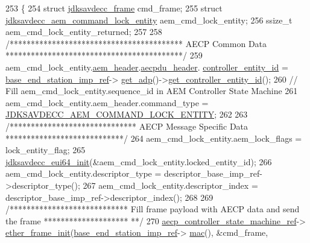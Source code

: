 \begin{DoxyCode}
253 \{
254     \textcolor{keyword}{struct }\hyperlink{structjdksavdecc__frame}{jdksavdecc\_frame} cmd\_frame;
255     \textcolor{keyword}{struct }\hyperlink{structjdksavdecc__aem__command__lock__entity}{jdksavdecc\_aem\_command\_lock\_entity} aem\_cmd\_lock\_entity;
256     ssize\_t aem\_cmd\_lock\_entity\_returned;
257 
258     \textcolor{comment}{/***************************************** AECP Common Data ******************************************/}
259     aem\_cmd\_lock\_entity.\hyperlink{structjdksavdecc__aem__command__lock__entity_ae1e77ccb75ff5021ad923221eab38294}{aem\_header}.\hyperlink{structjdksavdecc__aecpdu__aem_ae8460ae179666e7ce268ed1ef33d0de3}{aecpdu\_header}.
      \hyperlink{structjdksavdecc__aecpdu__common_affc928ddb4fc62d1d04a775d36e5f2c8}{controller\_entity\_id} = \hyperlink{classavdecc__lib_1_1descriptor__base__imp_a550c969411f5f3b69f55cc139763d224}{base\_end\_station\_imp\_ref}->
      \hyperlink{classavdecc__lib_1_1end__station__imp_a471a74540ce6182fad0c17dfd010107e}{get\_adp}()->\hyperlink{classavdecc__lib_1_1adp_a0c0959a46658c0a22e9530334b2912da}{get\_controller\_entity\_id}();
260     \textcolor{comment}{// Fill aem\_cmd\_lock\_entity.sequence\_id in AEM Controller State Machine}
261     aem\_cmd\_lock\_entity.aem\_header.command\_type = 
      \hyperlink{group__command_ga96be22db90d10cec463db06ab42751c4}{JDKSAVDECC\_AEM\_COMMAND\_LOCK\_ENTITY};
262 
263     \textcolor{comment}{/****************************** AECP Message Specific Data ****************************/}
264     aem\_cmd\_lock\_entity.aem\_lock\_flags = lock\_entity\_flag;
265     \hyperlink{group__eui64_ga6eda4ed21b6f0d526b180ac633eeba69}{jdksavdecc\_eui64\_init}(&aem\_cmd\_lock\_entity.locked\_entity\_id);
266     aem\_cmd\_lock\_entity.descriptor\_type = descriptor\_base\_imp\_ref->descriptor\_type();
267     aem\_cmd\_lock\_entity.descriptor\_index = descriptor\_base\_imp\_ref->descriptor\_index();
268 
269     \textcolor{comment}{/**************************** Fill frame payload with AECP data and send the frame ********************
      **/}
270     \hyperlink{namespaceavdecc__lib_a0b1b5aea3c0490f77cbfd9178af5be22}{aecp\_controller\_state\_machine\_ref}->
      \hyperlink{classavdecc__lib_1_1aecp__controller__state__machine_a86ff947c5e6b799cfb877d3767bfa1f9}{ether\_frame\_init}(\hyperlink{classavdecc__lib_1_1descriptor__base__imp_a550c969411f5f3b69f55cc139763d224}{base\_end\_station\_imp\_ref}->
      \hyperlink{classavdecc__lib_1_1end__station__imp_a08e1bd1861b3b8f447ea374a65ac11f9}{mac}(), &cmd\_frame,

\end{DoxyCode}
